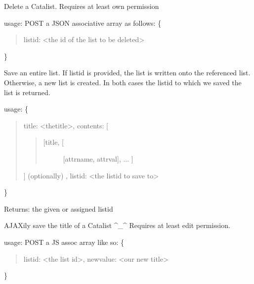 \documentclass[letterpaper,10pt,english]{sphinxmanual}
\begin{document}

\begin{fulllineitems}
\label{index:routes.list_delete}
Delete a Catalist. Requires at least own permission

usage: POST a JSON associative array as follows:
\{
\begin{quote}

listid: \textless{}the id of the list to be deleted\textgreater{}
\end{quote}

\}

\end{fulllineitems}


\begin{fulllineitems}
\label{index:routes.list_save}
Save an entire list. If listid is provided, the list is
written onto the referenced list. Otherwise, a new list is
created. In both cases the listid to which we saved the list
is returned.

usage:
\{
\begin{quote}

title: \textless{}thetitle\textgreater{},
contents: {[}
\begin{quote}
\begin{description}
\item[{{[}title, {[}}] \leavevmode
{[}attrname, attrval{]},
...
{]}

\end{description}
\end{quote}

{]}
(optionally) , listid: \textless{}the listid to save to\textgreater{}
\end{quote}

\}

Returns: the given or assigned listid

\end{fulllineitems}


\begin{fulllineitems}
\label{index:routes.list_title_save}
AJAXily save the title of a Catalist \textasciicircum{}\_\textasciicircum{}
Requires at least edit permission.

usage: POST a JS assoc array like so:
\{
\begin{quote}

listid: \textless{}the list id\textgreater{},
newvalue: \textless{}our new title\textgreater{}
\end{quote}

\}

\end{fulllineitems}
\end{document}
